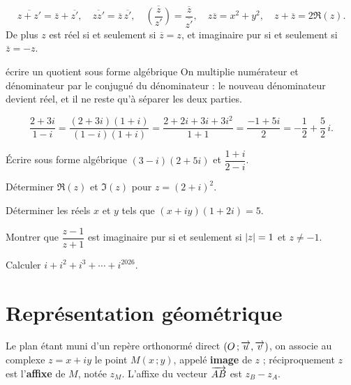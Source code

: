 \begin{propriete}
\[
  \overline{z+z'} = \overline z+\overline{z'}, \quad
  \overline{zz'} = \overline z\,\overline{z'}, \quad
  \overline{\left(\frac{z}{z'}\right)} = \frac{\overline z}{\overline{z'}},
  \quad z\overline z = x^{2}+y^{2}, \quad
  z+\overline z = 2\Re(z).
\]
De plus $z$ est réel si et seulement si $\overline z = z$, et imaginaire pur
si et seulement si $\overline z = -z$.
\end{propriete}

\begin{methode}{écrire un quotient sous forme algébrique}
On multiplie numérateur et dénominateur par le conjugué du dénominateur : le
nouveau dénominateur devient réel, et il ne reste qu'à séparer les deux
parties.
\end{methode}

\begin{exemple}[un quotient]
\[
  \frac{2+3i}{1-i}
  = \frac{(2+3i)(1+i)}{(1-i)(1+i)}
  = \frac{2+2i+3i+3i^{2}}{1+1}
  = \frac{-1+5i}{2}
  = -\frac12+\frac52\,i .
\]
\end{exemple}

\begin{entrainement}
\exo[\niveau{1}] Écrire sous forme algébrique $(3-i)(2+5i)$ et
$\dfrac{1+i}{2-i}$.

\exo[\niveau{1}] Déterminer $\Re(z)$ et $\Im(z)$ pour $z = (2+i)^{2}$.

\exo[\niveau{2}] Déterminer les réels $x$ et $y$ tels que
$(x+iy)(1+2i) = 5$.

\exo[\niveau{2}] Montrer que $\dfrac{z-1}{z+1}$ est imaginaire pur si et
seulement si $\left|z\right| = 1$ et $z \neq -1$.

\exo[\niveau{3}] Calculer $i+i^{2}+i^{3}+\cdots+i^{2026}$.
\end{entrainement}

\section{Représentation géométrique}

\begin{definition}[affixe]
Le plan étant muni d'un repère orthonormé direct $(O\,;\overrightarrow{u},\overrightarrow{v})$, on
associe au complexe $z = x+iy$ le point $M(x\,;y)$, appelé \textbf{image} de
$z$ ; réciproquement $z$ est l'\textbf{affixe} de $M$, notée $z_{M}$. L'affixe
du vecteur $\overrightarrow{AB}$ est $z_{B}-z_{A}$.
\end{definition}

